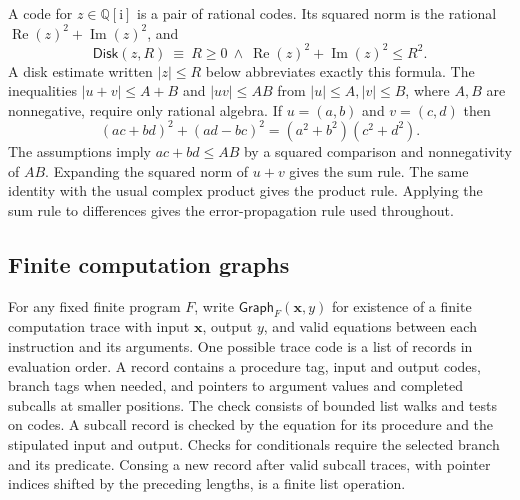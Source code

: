 \documentclass[11pt]{amsart}
\theoremstyle{definition}
\theoremstyle{remark}
\numberwithin{equation}{section}
\newcommand{\QQi}{\mathbb Q[\mathrm i]}
\newcommand{\disk}{\mathsf{Disk}}
\newcommand{\Gph}{\mathsf{Graph}}
\newcommand{\re}{\operatorname{Re}}
\newcommand{\im}{\operatorname{Im}}
\begin{document}
A code for $z\in\QQi$ is a pair of rational codes. Its squared norm
is the rational $\re(z)^2+\im(z)^2$, and
\[
 \disk(z,R) \ \equiv\ R\ge0\ \wedge\
        \re(z)^2+\im(z)^2\le R^2.
\]
A disk estimate written $|z|\le R$ below abbreviates exactly this formula.
The inequalities $|u+v|\le A+B$ and $|uv|\le AB$ from
$|u|\le A, |v|\le B$, where $A,B$ are nonnegative, require only
rational algebra. If $u=(a,b)$ and $v=(c,d)$ then
\[
 (ac+bd)^2+(ad-bc)^2=(a^2+b^2)(c^2+d^2).
\]
The assumptions imply $ac+bd\le AB$ by a squared
comparison and nonnegativity of $AB$. Expanding the squared norm of
$u+v$ gives the sum rule. The same identity with the usual complex
product gives the product rule. Applying the sum rule to differences
gives the error-propagation rule used throughout.

\subsection{Finite computation graphs}

For any fixed finite program $F$, write $\Gph_F(\mathbf x,y)$ for
existence of a finite computation trace with input $\mathbf x$, output
$y$, and valid equations between each instruction and its arguments.
One possible trace code is a list of records in evaluation order.
A record contains a procedure tag, input and output codes, branch tags
when needed, and pointers to argument values and completed subcalls
at smaller positions. The check consists of bounded list walks and tests
on codes. A subcall record is checked by the equation for its procedure
and the stipulated input and output. Checks for conditionals require the
selected branch and its predicate. Consing a new record after valid
subcall traces, with pointer indices shifted by the preceding lengths,
is a finite list operation.
\end{document}
